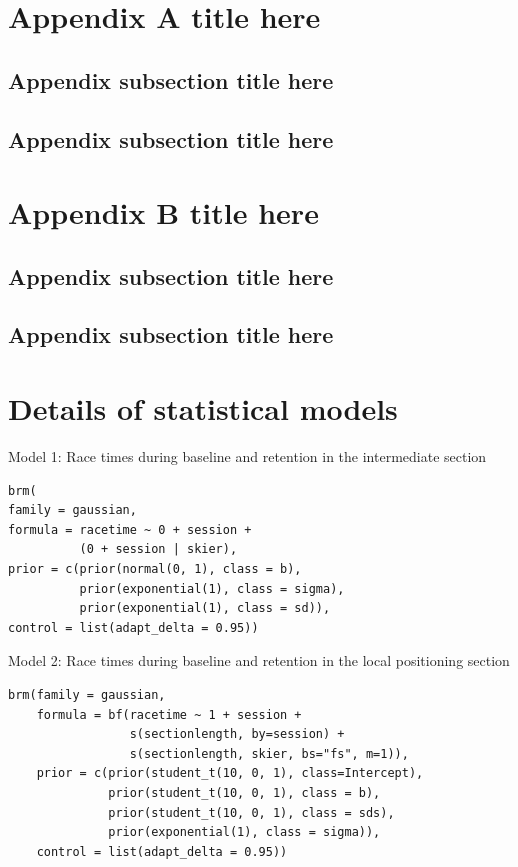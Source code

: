 \documentclass{article}
\begin{document}


\appendix

\section{Appendix A title here}\label{appendixa}
\subsection{Appendix subsection title here}
\subsection{Appendix subsection  title here}



\section{Appendix B title here}\label{appendixb}
\subsection{Appendix subsection title here}
\subsection{Appendix subsection  title here}


\section{Details of statistical models}\label{appendixc}

Model 1: Race times during baseline and retention in the intermediate section

\begin{verbatim}
brm(
family = gaussian,
formula = racetime ~ 0 + session + 
          (0 + session | skier),
prior = c(prior(normal(0, 1), class = b),
          prior(exponential(1), class = sigma),
          prior(exponential(1), class = sd)),
control = list(adapt_delta = 0.95))
\end{verbatim}


Model 2: Race times during baseline and retention in the local positioning section

\begin{verbatim}
brm(family = gaussian,
    formula = bf(racetime ~ 1 + session + 
                 s(sectionlength, by=session) +
                 s(sectionlength, skier, bs="fs", m=1)),
    prior = c(prior(student_t(10, 0, 1), class=Intercept),
              prior(student_t(10, 0, 1), class = b),
              prior(student_t(10, 0, 1), class = sds),
              prior(exponential(1), class = sigma)),
    control = list(adapt_delta = 0.95))
\end{verbatim}
\end{document}

